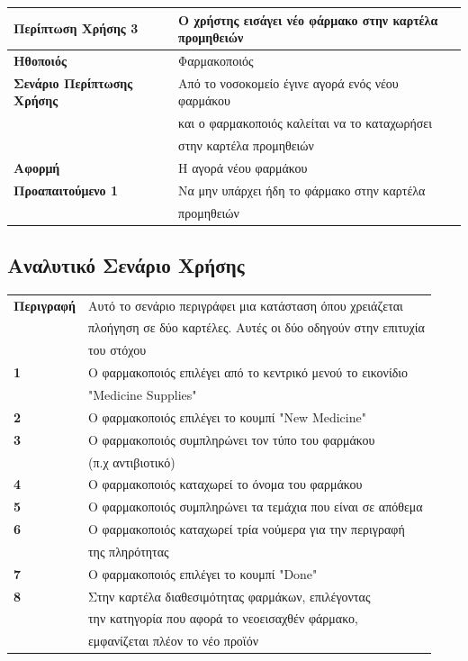 \documentclass{article}
\newcommand\T{\rule{0pt}{2.6ex}}       %
\newcommand\B{\rule[-1.2ex]{0pt}{0pt}}
\begin{document}
\begin{center}
     \begin{tabular}{|l|l|}
     \hline
      \textbf{Περίπτωση Χρήσης 3 }   & Ο χρήστης εισάγει νέο φάρμακο στην καρτέλα προμηθειών \T\B \\ 
      \hline
      \textbf{Ηθοποιός} & Φαρμακοποιός \T\B \\
      \hline
      \textbf{Σενάριο Περίπτωσης Χρήσης} & Από το νοσοκομείο έγινε αγορά ενός νέου φαρμάκου \\& και ο φαρμακοποιός καλείται να το καταχωρήσει \\& στην καρτέλα προμηθειών\T\B \\
      \hline
      \textbf{Αφορμή} & Η αγορά νέου φαρμάκου \T\B \\
      \hline
      \textbf{Προαπαιτούμενο 1} &  Να μην υπάρχει ήδη το φάρμακο στην καρτέλα \\& προμηθειών \T\B \\
      \hline
     \end{tabular}
 \end{center}
 
 \subsection{Αναλυτικό Σενάριο Χρήσης}
 
 \begin{center}
     \begin{tabular}{|l|l|}
     \hline
      \textbf{Περιγραφή }   & Αυτό το σενάριο περιγράφει μια κατάσταση όπου χρειάζεται \\& πλοήγηση σε δύο καρτέλες. Αυτές οι δύο οδηγούν στην επιτυχία \\& του στόχου  \T\B \\ 
      \hline
      \textbf{1} & Ο φαρμακοποιός επιλέγει από το κεντρικό μενού το εικονίδιο \\&  "Medicine Supplies" \T\B \\
      \hline
      \textbf{2} & Ο φαρμακοποιός επιλέγει το κουμπί "New Medicine" \T\B \\
      \hline
      \textbf{3} & Ο φαρμακοποιός συμπληρώνει τον τύπο του φαρμάκου \\& (π.χ αντιβιοτικό)\T\B \\
      \hline
      \textbf{4} & Ο φαρμακοποιός καταχωρεί το όνομα του φαρμάκου \T\B \\
      \hline
      \textbf{5} & Ο φαρμακοποιός συμπληρώνει τα τεμάχια που είναι σε απόθεμα \T\B \\
      \hline
      \textbf{6} & Ο φαρμακοποιός καταχωρεί τρία νούμερα για την περιγραφή \\&  της πληρότητας \T\B \\
      \hline
      \textbf{7} & Ο φαρμακοποιός επιλέγει το κουμπί "Done" \T\B \\
      \hline
      \textbf{8} & Στην καρτέλα διαθεσιμότητας φαρμάκων, επιλέγοντας \\ & την κατηγορία που αφορά το νεοεισαχθέν φάρμακο, \\& εμφανίζεται πλέον το νέο προϊόν \T\B \\
      \hline
     \end{tabular}
 \end{center}
 
\end{document}
